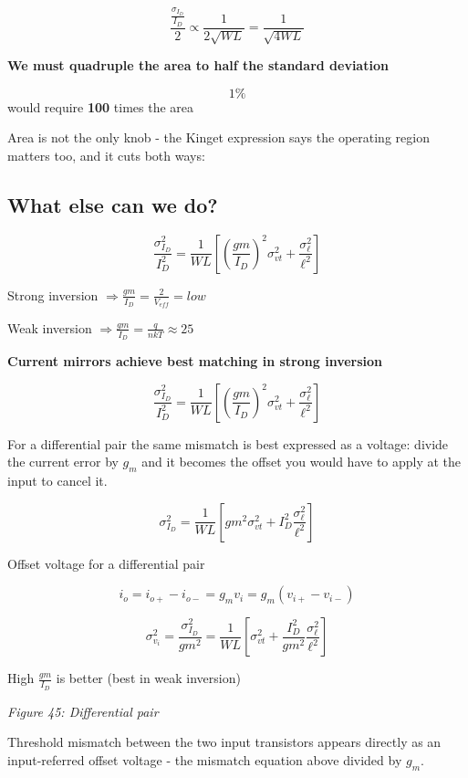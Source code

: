 \[\frac{\frac{\sigma_{I_D}}{I_D}}{2} \propto \frac{1}{2\sqrt{WL}} =  \frac{1}{\sqrt{4WL}}\]

\textbf{We must quadruple the area to half the standard deviation}

\[1 \%\] would require \textbf{100} times the area


{
\centering
{}
}

Area is not the only knob - the Kinget expression says the operating
region matters too, and it cuts both ways:

\subsection{What else can we do?}\label{what-else-can-we-do}

\[\frac{\sigma_{I_D}^2}{I_D^2} = \frac{1}{WL}\left[\left(\frac{gm}{I_D}\right)^2 \sigma_{vt}^2 + \frac{\sigma_{\ell}^2}{\ell^2}\right] \]

Strong inversion
\(\Rightarrow \frac{gm}{I_D} = \frac{2}{V_{eff}} = low\)

Weak inversion
\(\Rightarrow \frac{gm}{I_D} = \frac{q}{n k T} \approx 25\)

\textbf{Current mirrors achieve best matching in strong inversion}

\[\frac{\sigma_{I_D}^2}{I_D^2} = \frac{1}{WL}\left[\left(\frac{gm}{I_D}\right)^2 \sigma_{vt}^2 + \frac{\sigma_{\ell}^2}{\ell^2}\right] \]

For a differential pair the same mismatch is best expressed as a
voltage: divide the current error by \(g_m\) and it becomes the offset
you would have to apply at the input to cancel it.

\[\sigma_{I_D}^2 = \frac{1}{WL}\left[gm^2 \sigma_{vt}^2 + I_D^2\frac{\sigma_{\ell}^2}{\ell^2}\right] \]

Offset voltage for a differential pair

\[ i_o = i_{o+} - i_{o-} =  g_m v_i = g_m (v_{i+} - v_{i-})\]

\[ \sigma_{v_i}^2 = \frac{\sigma_{I_D}^2}{gm^2} = \frac{1}{WL}\left[\sigma_{vt}^2 + \frac{I_D^2}{gm^2}\frac{\sigma_{\ell}^2}{\ell^2}\right]  \]

High \(\frac{gm}{I_D}\) is better (best in weak inversion)


{
\centering
{}
}

\emph{Figure 45: Differential pair}

Threshold mismatch between the two input transistors appears directly as
an input-referred offset voltage - the mismatch equation above divided
by \(g_m\).

